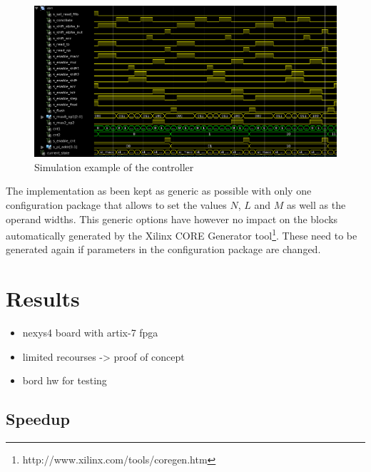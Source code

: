 \documentclass[mscthesis]{usiinfthesis}
\begin{document}
\begin{figure}
    \includegraphics[width=1\columnwidth]{./schema/test_ctrl.png}
    \caption{Simulation example of the controller}
    \label{fig:test_ctrl}
\end{figure}

The implementation as been kept as generic as possible with only
one configuration package that allows to set the values $N$, $L$ and $M$ as well
as the operand widths. This generic options have however no impact on the
blocks automatically generated by the Xilinx CORE Generator
tool\footnote{http://www.xilinx.com/tools/coregen.htm}. These need to be
generated again if parameters in the configuration package are changed.

\chapter{Results}
\label{ch:results}
\glsresetall %

\begin{itemize}
    \item nexys4 board with artix-7 fpga
    \item limited recourses -> proof of concept
    \item bord \gls{hw} for testing
\end{itemize}

\section{Speedup}
\end{document}
